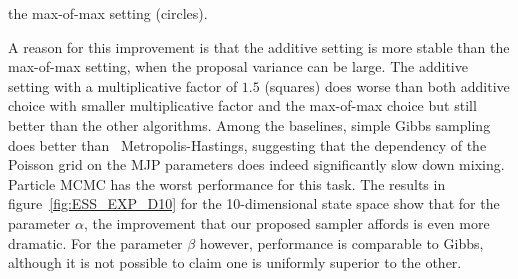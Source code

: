  the {max-of-max} setting (circles). {A reason for this improvement is 
  that the additive setting is more stable than the max-of-max setting, when the 
proposal variance can be large. The {additive setting with a multiplicative factor 
of $1.5$} (squares) does worse than both {additive choice with smaller multiplicative
factor and the max-of-max choice} but still better than the other algorithms. Among 
the baselines, simple Gibbs sampling 
does better than \naive\ Metropolis-Hastings, suggesting that the dependency of 
the Poisson grid on the MJP parameters does indeed significantly slow 
down mixing. Particle MCMC has the worst performance for this task. The
results in figure~\ref{fig:ESS_EXP_D10} for the 10-dimensional state space
show that for the parameter $\alpha$, the improvement that our proposed
sampler affords is even more dramatic. For the parameter $\beta$ however,
performance is comparable to Gibbs, although it is not possible to
claim one is uniformly superior to the other.

}
